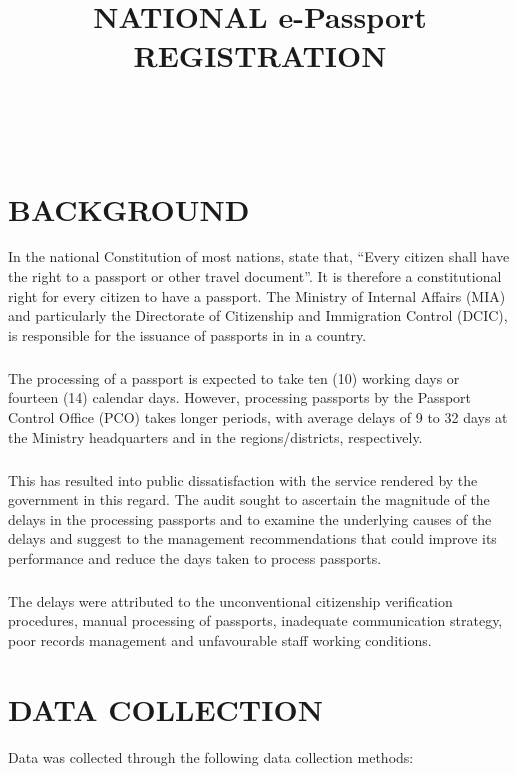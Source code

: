 \documentclass[]{report}
\title{NATIONAL e-Passport REGISTRATION}
\author{{}\\
       {}\\
}
\begin{document}
\maketitle

\chapter*{BACKGROUND}
In the national Constitution of most nations, state that, “Every citizen shall have the right to a passport or other travel document”. It is therefore a constitutional right for every citizen to have a passport. The Ministry of Internal Affairs (MIA) and particularly the Directorate of Citizenship and Immigration Control (DCIC), is responsible for the issuance of passports in in a country. 
\paragraph{}
The processing of a passport is expected to take ten (10) working days or fourteen (14) calendar days. However, processing passports by the Passport Control Office (PCO) takes longer periods, with average delays of 9 to 32 days at the Ministry headquarters and in the regions/districts, respectively.   
\paragraph{}
This has resulted into public dissatisfaction with the service rendered by the government in this regard. The audit sought to ascertain the magnitude of the delays in the processing passports and to examine the underlying causes of the delays and suggest to the management recommendations that could improve its performance and  reduce the days taken to process passports. 
\paragraph{}
The delays were attributed to the unconventional citizenship verification procedures, manual processing of passports, inadequate communication strategy, poor records management and unfavourable staff working conditions. 


\chapter*{DATA COLLECTION}
 Data was collected through the following data collection methods:
 \paragraph{}
\end{document}
